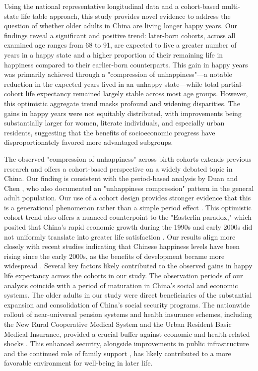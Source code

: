 \documentclass[12pt, a4paper]{article}
\begin{document}
Using the national representative longitudinal data and a cohort-based multi-state life table approach, this study provides novel evidence to address the question of whether older adults in China are living longer happy years. Our findings reveal a significant and positive trend: later-born cohorts, across all examined age ranges from 68 to 91, are expected to live a greater number of years in a happy state and a higher proportion of their remaining life in happiness compared to their earlier-born counterparts. This gain in happy years was primarily achieved through a "compression of unhappiness"—a notable reduction in the expected years lived in an unhappy state—while total partial-cohort life expectancy remained largely stable across most age groups. However, this optimistic aggregate trend masks profound and widening disparities. The gains in happy years were not equitably distributed, with improvements being substantially larger for women, literate individuals, and especially urban residents, suggesting that the benefits of socioeconomic progress have disproportionately favored more advantaged subgroups.

The observed "compression of unhappiness" across birth cohorts extends previous research and offers a cohort-based perspective on a widely debated topic in China. Our finding  is consistent with the period-based analysis by Duan and Chen \autocite{duan.2020.happy}, who also documented an "unhappiness compression" pattern in the general adult population. Our use of a cohort design provides stronger evidence that this is a generational phenomenon rather than a simple period effect \autocite{payne.2022.expansion}. This optimistic cohort trend also offers a nuanced counterpoint to the "Easterlin paradox," which posited that China’s rapid economic growth during the 1990s and early 2000s did not uniformly translate into greater life satisfaction \autocite{easterlin.2012.chinas,knight.2011.does,graham.2017.happiness}. Our results align more closely with recent studies indicating that Chinese happiness levels have been rising since the early 2000s, as the benefits of development became more widespread \autocite{wang.2023.hierarchical,cai.2023.does}. Several key factors likely contributed to the observed gains in happy life expectancy across the cohorts in our study. The observation periods of our analysis coincide with a period of maturation in China's social and economic systems. The older adults in our study were direct beneficiaries of the substantial expansion and consolidation of China's social security programs. The nationwide rollout of near-universal pension systems and health insurance schemes, including the New Rural Cooperative Medical System and the Urban Resident Basic Medical Insurance, provided a crucial buffer against economic and health-related shocks \autocite{liu.2019.are,guo.2024.regional,cheng.2021.sociodemographic}. This enhanced security, alongside improvements in public infrastructure \autocite{dong,dong.2017.exploring} and the continued role of family support \autocite{zhao.2023.chinas,huang.2021.intergenerational}, has likely contributed to a more favorable environment for well-being in later life.
\end{document}

